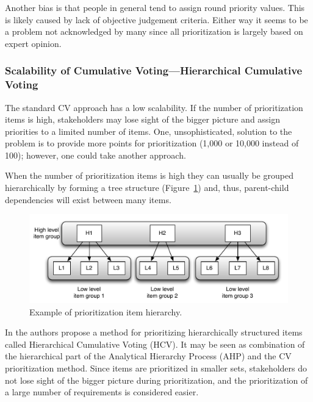 Another bias is that people in general tend to assign round priority
values. This is likely caused by lack of objective judgement criteria. Either
way it seems to be a problem not acknowledged by many since all prioritization is largely
based on expert opinion.

\subsubsection{Scalability of Cumulative Voting---Hierarchical Cumulative Voting\label{hcv}}

The standard CV approach has a low scalability. If the number of prioritization items
is high, stakeholders may lose sight of the bigger picture and assign priorities to a
limited number of items. One, unsophisticated, solution to the problem is to provide
more points for prioritization (1,000 or 10,000 instead of 100); however, one could take another approach. 

When the number of prioritization items is high they can usually 
be grouped hierarchically by forming a tree structure (Figure~\ref{fig:Prionitization-Item-Hierarchy}) 
and, thus, parent-child dependencies will exist between many items.

\begin{figure}
	\center
\includegraphics[scale=0.45]{fig/hcv-example1}
\caption{\label{fig:Prionitization-Item-Hierarchy}Example of prioritization item hierarchy.}
\end{figure}

In \cite{Berander2006a} the authors propose a method for prioritizing hierarchically
structured items called Hierarchical Cumulative Voting (HCV). It may
be seen as combination of the hierarchical part of the Analytical Hierarchy
Process (AHP) \cite{Berander2005,Saaty1980a} and the CV prioritization method.
Since items are prioritized in smaller sets, stakeholders do not lose
sight of the bigger picture during prioritization, and the prioritization of a large number
of requirements is considered easier.

